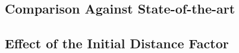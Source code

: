 \subsection{Comparison Against State-of-the-art}
\subsection{Effect of the Initial Distance Factor}
